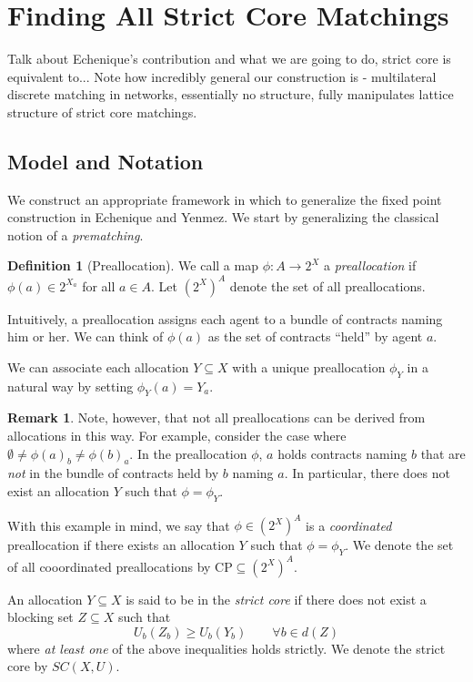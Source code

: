 \documentclass[11pt,reqno]{amsart}
\theoremstyle{definition}
\newtheorem{defn}[thm]{Definition}
\newtheorem{remark}[thm]{Remark}
\numberwithin{equation}{section}
\newcommand{\pre}{\phi}
\newcommand{\coordpre}{\mathrm{CP}}
\newcommand{\prealloc}{(2^X)^A}
\newcommand{\sub}{\subseteq}
\begin{document}
\section{Finding All Strict Core Matchings}
Talk about Echenique's contribution and what we are going to do, strict core is equivalent to...
Note how incredibly general our construction is - multilateral discrete matching in networks, essentially no structure, fully manipulates lattice structure of strict core matchings.   
\subsection{Model and Notation}
We construct an appropriate framework in which to generalize the fixed point construction in Echenique and Yenmez. 
We start by generalizing the classical notion of a \emph{prematching}. 

\begin{defn}[Preallocation] We call a map $\pre: A \to 2^X$ a \emph{preallocation} if $\pre(a) \in 2^{X_a}$ for all $a\in A$. Let $(2^X)^A$ denote the set of all preallocations.  
\end{defn}

Intuitively, a preallocation assigns each agent to a bundle of contracts naming him or her. We can think of $\pre(a)$ as the set of contracts ``held'' by agent $a$.   

We can associate each allocation $Y\subseteq X$ with a unique preallocation $\pre_Y$ in a natural way by setting $\pre_Y(a) = Y_a$.
\begin{remark} Note, however, that not all preallocations can be derived from allocations in this way.
For example, consider the case where $\emptyset \not = \pre(a)_b \not = \pre(b)_a$. In the preallocation $\pre$, $a$ holds contracts naming $b$ that are \emph{not} in the bundle of contracts held by $b$ naming $a$.  
In particular, there does not exist an allocation $Y$ such that $\pre = \pre_Y$. 
\end{remark}

With this example in mind, we say that $\pre \in \prealloc$ is a \emph{coordinated} preallocation if there exists an allocation $Y$ such that $\pre = \pre_Y$. 
We denote the set of all cooordinated preallocations by $\coordpre\sub \prealloc$.

An allocation $Y \sub X$ is said to be in the \emph{strict core} if there does not exist a blocking set $Z \sub X$ such that 
\[
U_b(Z_b) \geq U_b(Y_b) \qquad  \forall b\in d(Z)
\]
where \emph{at least one} of the above inequalities holds strictly. We denote the strict core by $SC(X,U)$. 
\end{document}
